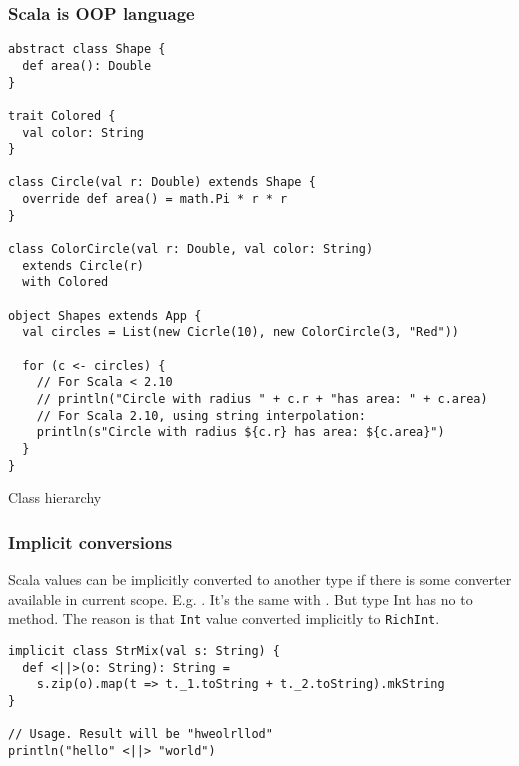 \documentclass{beamer}
\begin{document}
\begin{frame}[fragile]
\frametitle{Scala is OOP language}

\begin{lstlisting}
abstract class Shape {
  def area(): Double
}

trait Colored {
  val color: String
}

class Circle(val r: Double) extends Shape {
  override def area() = math.Pi * r * r
}

class ColorCircle(val r: Double, val color: String) 
  extends Circle(r) 
  with Colored

object Shapes extends App {
  val circles = List(new Cicrle(10), new ColorCircle(3, "Red"))

  for (c <- circles) {
    // For Scala < 2.10
    // println("Circle with radius " + c.r + "has area: " + c.area)
    // For Scala 2.10, using string interpolation:
    println(s"Circle with radius ${c.r} has area: ${c.area}")
  }
}

\end{lstlisting}
\end{frame}

\begin{frame}{Class hierarchy}


\end{frame}


\begin{frame}[fragile]
\frametitle{Implicit conversions}

Scala values can be implicitly converted to another type if there is some converter available in current scope. E.g.
. It's the same with . But type Int has no to method.
The reason is that \texttt{Int} value converted implicitly to \texttt{RichInt}.

\begin{example}
\begin{lstlisting}
implicit class StrMix(val s: String) {
  def <||>(o: String): String =
    s.zip(o).map(t => t._1.toString + t._2.toString).mkString
}

// Usage. Result will be "hweolrllod"
println("hello" <||> "world")
\end{lstlisting}
\end{example}

\end{frame}
\end{document}
